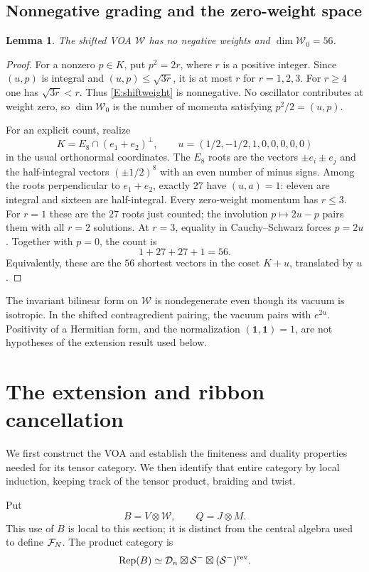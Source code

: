 \documentclass[11pt]{article}
\newtheorem{lemma}[theorem]{Lemma}
\newcommand{\one}{\mathbf1}\newcommand{\D}{\mathcal D}\newcommand{\Dcat}{\mathcal D}
\newcommand{\Scat}{\mathcal S}\newcommand{\U}{\mathcal U}\newcommand{\bo}{\boxtimes}
\numberwithin{equation}{section}
\begin{document}
\subsection{Nonnegative grading and the zero-weight space}
\begin{lemma}\label{E:Wzero}
The shifted VOA $\mathcal W$ has no negative weights and $\dim \mathcal W_0=56$.
\end{lemma}
\begin{proof}
For a nonzero $p\in K$, put $p^2=2r$, where $r$ is a positive integer. Since $(u,p)$ is integral and $(u,p)\leq\sqrt{3r}$, it is at most $r$ for $r=1,2,3$. For $r\geq4$ one has $\sqrt{3r}<r$. Thus \eqref{E:shiftweight} is nonnegative. No oscillator contributes at weight zero, so $\dim \mathcal W_0$ is the number of momenta satisfying $p^2/2=(u,p)$.

For an explicit count, realize
\[
K=E_8\cap(e_1+e_2)^\perp,\qquad
u=(1/2,-1/2,1,0,0,0,0,0)
\]
in the usual orthonormal coordinates. The $E_8$ roots are the vectors $\pm e_i\pm e_j$ and the half-integral vectors $(\pm1/2)^8$ with an even number of minus signs. Among the roots perpendicular to $e_1+e_2$, exactly $27$ have $(u,a)=1$: eleven are integral and sixteen are half-integral. Every zero-weight momentum has $r\leq3$. For $r=1$ these are the $27$ roots just counted; the involution $p\mapsto2u-p$ pairs them with all $r=2$ solutions. At $r=3$, equality in Cauchy--Schwarz forces $p=2u$. Together with $p=0$, the count is
\[
1+27+27+1=56.
\]
Equivalently, these are the $56$ shortest vectors in the coset $K+u$, translated by $u$.
\end{proof}

The invariant bilinear form on $\mathcal W$ is nondegenerate even though its vacuum is isotropic. In the shifted contragredient pairing, the vacuum pairs with $e^{2u}$. Positivity of a Hermitian form, and the normalization $(\one,\one)=1$, are not hypotheses of the extension result used below.

\section{The extension and ribbon cancellation}\label{E:extension}
We first construct the VOA and establish the finiteness and duality properties needed for its tensor category. We then identify that entire category by local induction, keeping track of the tensor product, braiding and twist.

Put
\[
B=V\otimes \mathcal W,\qquad Q=J\otimes M.
\]
This use of $B$ is local to this section; it is distinct from the central algebra used to define $\mathcal F_N$. The product category is
\begin{equation}\label{E:basecat}
\Rep(B)\simeq\D_n\bo\Scat^-\bo(\Scat^-)^{\mathrm{rev}}.
\end{equation}
\end{document}
